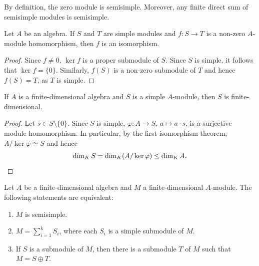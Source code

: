 By definition, the zero module is semisimple. Moreover, 
any finite direct sum of semisimple modules is semisimple. 


\begin{lemma}[Schur]
	Let $A$ be an algebra. If $S$ and $T$ are
	simple modules and $f\colon S\to T$ is a non-zero $A$-module homomorphism, 
	then $f$ is an isomorphism. 
\end{lemma}

\begin{proof}
Since $f\ne 0$, $\ker f$ is a proper submodule of $S$. Since $S$ is simple, it follows 
that $\ker f=\{0\}$. Similarly, $f(S)$ 
is a non-zero submodule of $T$ and hence $f(S)=T$, as $T$ is simple. 	
\end{proof}

\begin{proposition}
    If $A$ is a finite-dimensional algebra and $S$ is a simple $A$-module, then
    $S$ is finite-dimensional. 
\end{proposition}

\begin{proof}
    Let $s\in S\setminus\{0\}$. Since $S$ is simple, $\varphi\colon A\to S$,
    $a\mapsto a\cdot s$, is a surjective module homomorphism.  In particular,
    by the first isomorphism theorem, $A/\ker\varphi\simeq S$ and hence 
    \[
    \dim_K S=\dim_K (A/\ker\varphi)\leq \dim_K A.\qedhere
    \]
\end{proof}

\begin{proposition}
\label{pro:semisimple}
	Let $A$ be a finite-dimensional algebra and $M$ a finite-dimensional $A$-module. The following statements are equivalent:
	\begin{enumerate}
		\item $M$ is semisimple.
		\item $M=\sum_{i=1}^k S_i$, where each $S_i$ is a simple submodule of $M$. 
		\item If $S$ is a submodule of $M$, then there is a submodule $T$ of $M$ such that $M=S\oplus T$.    
	\end{enumerate}
\end{proposition}

